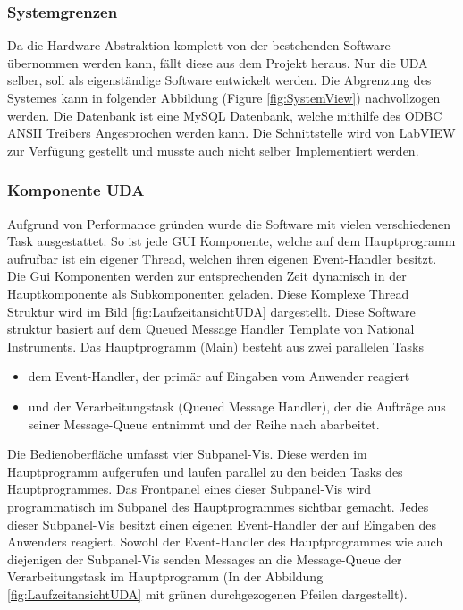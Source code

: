 \documentclass[10pt]{scrartcl}
\begin{document}
\subsubsection{Systemgrenzen}
Da die Hardware Abstraktion komplett von der bestehenden Software übernommen werden kann, fällt diese aus dem Projekt heraus. Nur die UDA selber, soll als eigenständige Software entwickelt werden. Die Abgrenzung des Systemes kann in folgender Abbildung (Figure \ref{fig:SystemView}) nachvollzogen werden.
 Die Datenbank ist eine MySQL Datenbank, welche mithilfe des ODBC ANSII Treibers Angesprochen werden kann. Die Schnittstelle wird von \gls{LabVIEW} zur Verfügung gestellt und musste auch nicht selber Implementiert werden.
\subsubsection{Komponente UDA}
Aufgrund von Performance gründen wurde die Software mit vielen verschiedenen Task ausgestattet. So ist jede GUI Komponente, welche auf dem Hauptprogramm aufrufbar ist ein eigener Thread,  welchen ihren eigenen Event-Handler besitzt. Die Gui Komponenten werden zur entsprechenden Zeit dynamisch in der Hauptkomponente als Subkomponenten geladen. Diese Komplexe Thread Struktur wird im Bild \ref{fig:LaufzeitansichtUDA} dargestellt. Diese Software struktur basiert auf dem Queued Message Handler Template von National Instruments.
Das Hauptprogramm (Main) besteht aus zwei parallelen Tasks
\begin{itemize}
	\item dem Event-Handler, der primär auf Eingaben vom Anwender reagiert
	\item und der Verarbeitungstask (Queued Message Handler), der die Aufträge aus seiner Message-Queue entnimmt und der Reihe nach abarbeitet.
\end{itemize}

Die Bedienoberfläche umfasst vier Subpanel-Vis. Diese werden im Hauptprogramm aufgerufen und laufen parallel zu den beiden Tasks des Hauptprogrammes. Das \gls{Frontpanel} eines dieser Subpanel-Vis wird programmatisch im Subpanel des Hauptprogrammes sichtbar gemacht.  
Jedes dieser Subpanel-Vis besitzt einen eigenen Event-Handler der auf Eingaben des Anwenders reagiert. Sowohl der Event-Handler des Hauptprogrammes wie auch diejenigen der Subpanel-Vis senden Messages an die Message-Queue der Verarbeitungstask im Hauptprogramm (In der Abbildung \ref{fig:LaufzeitansichtUDA} mit grünen durchgezogenen Pfeilen dargestellt).
\end{document}
